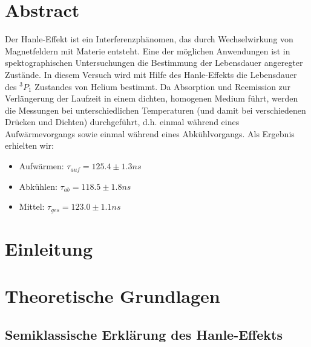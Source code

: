 \documentclass[12pt]{article}
\title{\vspace{0cm}{\Huge Fortgeschrittenen-Praktikum I:\\ \vspace{1cm} Der Hanle-Effekt}}
\author{Saskia Bondza\\Simon Stephan}
\date{durchgeführt am 28. und 29.09.2016}
\begin{document}
\maketitle
\newpage

\section*{Abstract}

Der Hanle-Effekt ist ein Interferenzphänomen, das durch Wechselwirkung von Magnetfeldern mit Materie entsteht. Eine der möglichen Anwendungen ist in spektographischen Untersuchungen die Bestimmung der Lebensdauer angeregter Zustände. In diesem Versuch wird mit Hilfe des Hanle-Effekts die Lebensdauer des $^3P_1$ Zustandes von Helium bestimmt. Da Absorption und Reemission zur Verlängerung der Laufzeit in einem dichten, homogenen Medium führt, werden die Messungen bei unterschiedlichen Temperaturen (und damit bei verschiedenen Drücken und Dichten) durchgeführt, d.h. einmal während eines Aufwärmevorgangs sowie einmal während eines Abkühlvorgangs. Als Ergebnis erhielten wir:
\begin{itemize}
	\item Aufwärmen: $\tau_{auf} = 125.4 \pm 1.3 ns$
	\item Abkühlen: $\tau_{ab} = 118.5 \pm 1.8 ns$
	\item Mittel: $\tau_{ges} = 123.0 \pm 1.1 ns$
\end{itemize}

\newpage

\thispagestyle{empty}
\tableofcontents
\newpage

\section{Einleitung}




\newpage
\section{Theoretische Grundlagen}

\subsection{Semiklassische Erklärung des Hanle-Effekts}
\end{document}

